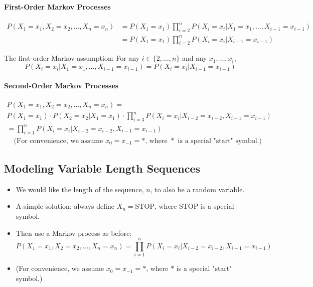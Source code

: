 \documentclass{book}
\begin{document}
\paragraph{First-Order Markov Processes}

    \begin{align*}
        P(X_1 = x_1, X_2 = x_2, \ldots, X_n = x_n) &= P(X_1 = x_1) \prod_{i=2}^{n} P(X_i = x_i|X_1 = x_1, \ldots, X_{i-1} = x_{i-1}) \\
        &= P(X_1 = x_1) \prod_{i=2}^{n} P(X_i = x_i|X_{i-1} = x_{i-1})
    \end{align*}
    
    The first-order Markov assumption: For any $i \in \{2, \ldots, n\}$ and any $x_1, \ldots, x_i$,
    \[
    P(X_i = x_i|X_1 = x_1, \ldots, X_{i-1} = x_{i-1}) = P(X_i = x_i|X_{i-1} = x_{i-1})
    \]


\paragraph{Second-Order Markov Processes}
    \scriptsize
    \begin{align*}
        P(X_1 = x_1, X_2 = x_2, \ldots, X_n = x_n) = \\  P(X_1 = x_1) \cdot P(X_2 = x_2|X_1 = x_1) \cdot \prod_{i=3}^{n} P(X_i = x_i|X_{i-2} = x_{i-2}, X_{i-1} = x_{i-1}) \\
        = \prod_{i=1}^{n} P(X_i = x_i|X_{i-2} = x_{i-2}, X_{i-1} = x_{i-1}) \\
        \quad \text{(For convenience, we assume $x_0 = x_{-1} = *$, where $*$ is a special "start" symbol.)}
    \end{align*}
    
    
  
\subsection{Modeling Variable Length Sequences}
       \begin{itemize}
        \item We would like the length of the sequence, $n$, to also be a random variable.
        \item A simple solution: always define $X_n = \text{STOP}$, where STOP is a special symbol.
        \item Then use a Markov process as before:
        \[
            P(X_1 = x_1, X_2 = x_2, \ldots, X_n = x_n) = \prod_{i=1}^{n} P(X_i = x_i|X_{i-2} = x_{i-2}, X_{i-1} = x_{i-1})
        \]
        \item (For convenience, we assume $x_0 = x_{-1} = *$, where $*$ is a special "start" symbol.)
    \end{itemize}
\end{document}

